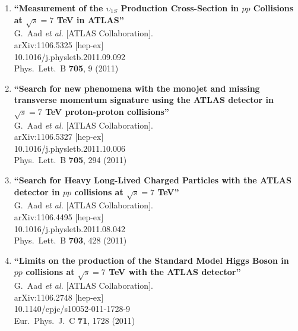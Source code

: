 \documentclass{article}
\begin{document}
\begin{enumerate}
\item%
{\bf ``Measurement of the $\upsilon_{1S}$ Production Cross-Section in $pp$ Collisions at $\sqrt{s}=7$ TeV in ATLAS''}
  \\{}G.~Aad {\it et al.}  [ATLAS Collaboration].
  \\{}arXiv:1106.5325 [hep-ex]
    \\{}10.1016/j.physletb.2011.09.092
\\{}Phys.\ Lett.\ B {\bf 705}, 9 (2011) %


\item%
{\bf ``Search for new phenomena with the monojet and missing transverse momentum signature using the ATLAS detector in $\sqrt{s}=7$ TeV proton-proton collisions''}
  \\{}G.~Aad {\it et al.}  [ATLAS Collaboration].
  \\{}arXiv:1106.5327 [hep-ex]
    \\{}10.1016/j.physletb.2011.10.006
\\{}Phys.\ Lett.\ B {\bf 705}, 294 (2011) %


\item%
{\bf ``Search for Heavy Long-Lived Charged Particles with the ATLAS detector in $pp$ collisions at $\sqrt{s}=7$ TeV''}
  \\{}G.~Aad {\it et al.}  [ATLAS Collaboration].
  \\{}arXiv:1106.4495 [hep-ex]
    \\{}10.1016/j.physletb.2011.08.042
\\{}Phys.\ Lett.\ B {\bf 703}, 428 (2011) %


\item%
{\bf ``Limits on the production of the Standard Model Higgs Boson in $pp$ collisions at $\sqrt{s}=7$ TeV with the ATLAS detector''}
  \\{}G.~Aad {\it et al.}  [ATLAS Collaboration].
  \\{}arXiv:1106.2748 [hep-ex]
    \\{}10.1140/epjc/s10052-011-1728-9
\\{}Eur.\ Phys.\ J.\ C {\bf 71}, 1728 (2011) %



\end{enumerate}
\end{document}
